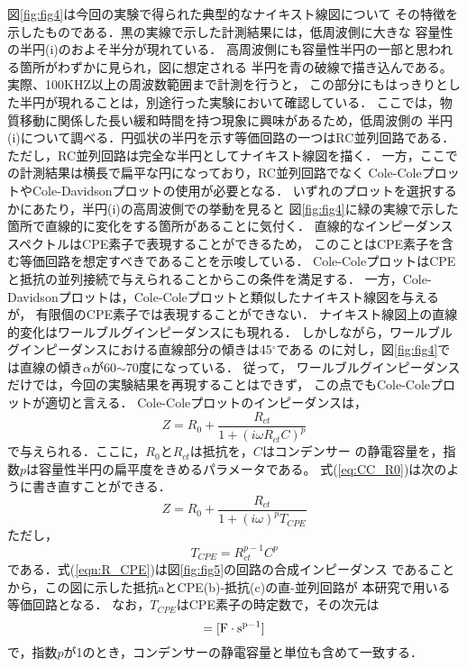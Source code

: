 \documentclass{jsce}
\begin{document}
図\ref{fig:fig4}は今回の実験で得られた典型的なナイキスト線図について
その特徴を示したものである．黒の実線で示した計測結果には，低周波側に大きな
容量性の半円(i)のおよそ半分が現れている．
高周波側にも容量性半円の一部と思われる箇所がわずかに見られ，図に想定される
半円を青の破線で描き込んである。実際、100KHZ以上の周波数範囲まで計測を行うと，
この部分にもはっきりとした半円が現れることは，別途行った実験において確認している．
ここでは，物質移動に関係した長い緩和時間を持つ現象に興味があるため，低周波側の
半円(i)について調べる．円弧状の半円を示す等価回路の一つはRC並列回路である．
ただし，RC並列回路は完全な半円としてナイキスト線図を描く．
一方，ここでの計測結果は横長で扁平な円になっており，RC並列回路でなく
Cole-ColeプロットやCole-Davidsonプロットの使用が必要となる．
いずれのプロットを選択するかにあたり，半円(i)の高周波側での挙動を見ると
図\ref{fig:fig4}に緑の実線で示した箇所で直線的に変化をする箇所があることに気付く．
直線的なインピーダンススペクトルはCPE素子で表現することができるため，
このことはCPE素子を含む等価回路を想定すべきであることを示唆している．
Cole-ColeプロットはCPEと抵抗の並列接続で与えられることからこの条件を満足する．
一方，Cole-Davidsonプロットは，Cole-Coleプロットと類似したナイキスト線図を与えるが，
有限個のCPE素子では表現することができない．
ナイキスト線図上の直線的変化はワールブルグインピーダンスにも現れる．
しかしながら，ワールブルグインピーダンスにおける直線部分の傾きは45$^\circ$である
のに対し，図\ref{fig:fig4}では直線の傾き$\alpha$が60$\sim$70度になっている．
従って， ワールブルグインピーダンスだけでは，今回の実験結果を再現することはできず，
この点でもCole-Coleプロットが適切と言える．
Cole-Coleプロットのインピーダンスは，
\begin{equation}
        Z=R_0 +\frac{R_{ct}}{1+\left( i\omega R_{ct}C\right)^p}
        \label{eqn:CC_R0}
\end{equation}
で与えられる．ここに，$R_0$と$R_{ct}$は抵抗を，$C$はコンデンサー
の静電容量を，指数$p$は容量性半円の扁平度をきめるパラメータである。
式(\ref{eq:CC_R0})は次のように書き直すことができる．
\begin{equation}
        Z=R_0 +\frac{R_{ct}}{1+\left( i\omega \right)^pT_{CPE}}
        \label{eqn:R_CPE}
\end{equation}
ただし，
\begin{equation}
        T_{CPE}=R_{ct}^{p-1}C^{p}
        \label{eqn:T_CPE}
\end{equation}
である．式(\ref{eqn:R_CPE})は図\ref{fig:fig5}の回路の合成インピーダンス
であることから，この図に示した抵抗aとCPE(b)-抵抗(c)の直-並列回路が
本研究で用いる等価回路となる．
なお，$T_{CPE}$はCPE素子の時定数で，その次元は
\begin{equation}
        [T_{CPE}] ={\rm [ F\cdot s^{p-1}]}
        \label{eqn:}
\end{equation}
で，指数$p$が1のとき，コンデンサーの静電容量と単位も含めて一致する．
\end{document}
